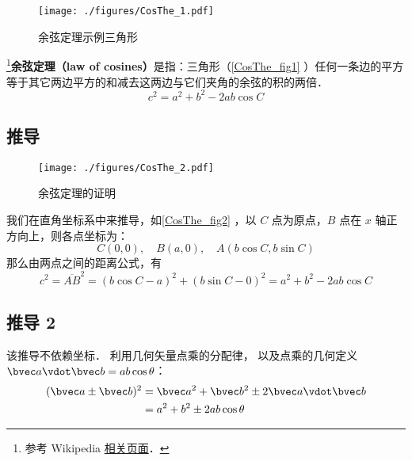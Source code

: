 
\begin{figure}[ht]
\centering
\texttt{[image: ./figures/CosThe\_1.pdf]}
\caption{余弦定理示例三角形} \label{CosThe_fig1}
\end{figure}

\footnote{参考 Wikipedia \href{https://en.wikipedia.org/wiki/Law_of_cosines}{相关页面}．}\textbf{余弦定理（law of cosines）}是指：三角形（\autoref{CosThe_fig1} ）任何一条边的平方等于其它两边平方的和减去这两边与它们夹角的余弦的积的两倍．
\begin{equation}\label{CosThe_eq1}
c^2=a^2 + b^2 - 2ab\cos C
\end{equation}


\subsection{推导}
\begin{figure}[ht]
\centering
\texttt{[image: ./figures/CosThe\_2.pdf]}
\caption{余弦定理的证明} \label{CosThe_fig2}
\end{figure}
我们在直角坐标系中来推导，如\autoref{CosThe_fig2} ，以 $C$ 点为原点，$B$ 点在 $x$ 轴正方向上，则各点坐标为：
\begin{equation}
C(0,0),\quad B(a,0),\quad A(b\cos C,b\sin C)
\end{equation}
那么由两点之间的距离公式，有
\begin{equation}
c^2=\overline{AB}^2=(b\cos C-a)^2+(b\sin C-0)^2=a^2+b^2-2ab\cos C
\end{equation}

\subsection{推导 2}
该推导不依赖坐标． 利用几何矢量点乘的分配律， 以及点乘的几何定义 $\bvec a \vdot \bvec b = ab\cos\theta$：
\begin{equation}\label{CosThe_eq2}
\begin{aligned}
(\bvec a \pm \bvec b)^2 &= \bvec a^2 + \bvec b^2 \pm 2\bvec a \vdot \bvec b\\
&= a^2 + b^2 \pm 2ab \cos\theta
\end{aligned}
\end{equation}
